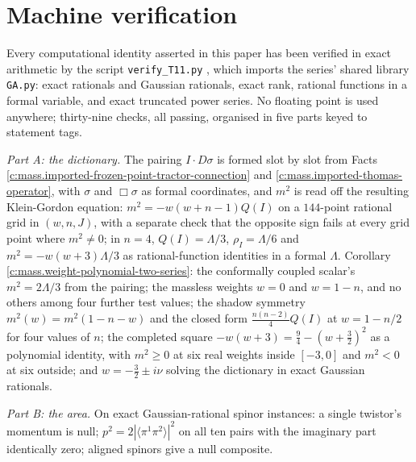 \documentclass[11pt]{article}
\theoremstyle{definition}
\theoremstyle{plain}
\providecommand{\br}{}\renewcommand{\br}[1]{\langle #1\rangle}
\begin{document}
\section{Machine verification}

\label{c:note.mass.setting-machine-verification}
Every computational identity asserted in this paper has been verified in exact arithmetic by the script \texttt{verify\_T11.py} \cite{ButlerVerifyT11}, which imports the series' shared library \texttt{GA.py}: exact rationals and Gaussian rationals, exact rank, rational functions in a formal variable, and exact truncated power series. No floating point is used anywhere; thirty-nine checks, all passing, organised in five parts keyed to statement tags.

\emph{Part A: the dictionary.} The pairing $I \cdot D\sigma$ is formed slot by slot from Facts \ref{c:mass.imported-frozen-point-tractor-connection} and \ref{c:mass.imported-thomas-operator}, with $\sigma$ and $\Box\sigma$ as formal coordinates, and $m^{2}$ is read off the resulting Klein-Gordon equation: $m^{2} = -w(w+n-1)Q(I)$ on a $144$-point rational grid in $(w, n, J)$, with a separate check that the opposite sign fails at every grid point where $m^{2} \neq 0$; in $n = 4$, $Q(I) = \Lambda/3$, $\rho_{I} = \Lambda/6$ and $m^{2} = -w(w+3)\Lambda/3$ as rational-function identities in a formal $\Lambda$. Corollary \ref{c:mass.weight-polynomial-two-series}: the conformally coupled scalar's $m^{2} = 2\Lambda/3$ from the pairing; the massless weights $w = 0$ and $w = 1-n$, and no others among four further test values; the shadow symmetry $m^{2}(w) = m^{2}(1-n-w)$ and the closed form $\tfrac{n(n-2)}{4}Q(I)$ at $w = 1 - n/2$ for four values of $n$; the completed square $-w(w+3) = \tfrac94 - (w+\tfrac32)^{2}$ as a polynomial identity, with $m^{2} \ge 0$ at six real weights inside $[-3,0]$ and $m^{2} < 0$ at six outside; and $w = -\tfrac32 \pm i\nu$ solving the dictionary in exact Gaussian rationals.

\emph{Part B: the area.} On exact Gaussian-rational spinor instances: a single twistor's momentum is null; $p^{2} = 2|\br{\pi^{1}\pi^{2}}|^{2}$ on all ten pairs with the imaginary part identically zero; aligned spinors give a null composite.
\end{document}
